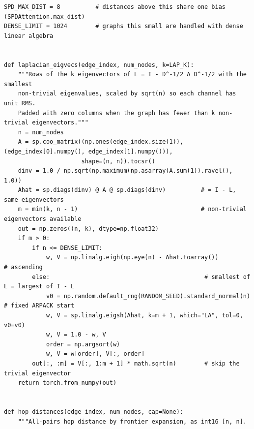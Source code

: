 \begin{lstlisting}[style=p1py]
SPD_MAX_DIST = 8          # distances above this share one bias (SPDAttention.max_dist)
DENSE_LIMIT = 1024        # graphs this small are handled with dense linear algebra


def laplacian_eigvecs(edge_index, num_nodes, k=LAP_K):
    """Rows of the k eigenvectors of L = I - D^-1/2 A D^-1/2 with the smallest
    non-trivial eigenvalues, scaled by sqrt(n) so each channel has unit RMS.
    Padded with zero columns when the graph has fewer than k non-trivial eigenvectors."""
    n = num_nodes
    A = sp.coo_matrix((np.ones(edge_index.size(1)), (edge_index[0].numpy(), edge_index[1].numpy())),
                      shape=(n, n)).tocsr()
    dinv = 1.0 / np.sqrt(np.maximum(np.asarray(A.sum(1)).ravel(), 1.0))
    Ahat = sp.diags(dinv) @ A @ sp.diags(dinv)          # = I - L, same eigenvectors
    m = min(k, n - 1)                                   # non-trivial eigenvectors available
    out = np.zeros((n, k), dtype=np.float32)
    if m > 0:
        if n <= DENSE_LIMIT:
            w, V = np.linalg.eigh(np.eye(n) - Ahat.toarray())           # ascending
        else:                                            # smallest of L = largest of I - L
            v0 = np.random.default_rng(RANDOM_SEED).standard_normal(n)   # fixed ARPACK start
            w, V = sp.linalg.eigsh(Ahat, k=m + 1, which="LA", tol=0, v0=v0)
            w, V = 1.0 - w, V
            order = np.argsort(w)
            w, V = w[order], V[:, order]
        out[:, :m] = V[:, 1:m + 1] * math.sqrt(n)        # skip the trivial eigenvector
    return torch.from_numpy(out)


def hop_distances(edge_index, num_nodes, cap=None):
    """All-pairs hop distance by frontier expansion, as int16 [n, n].


\end{lstlisting}

